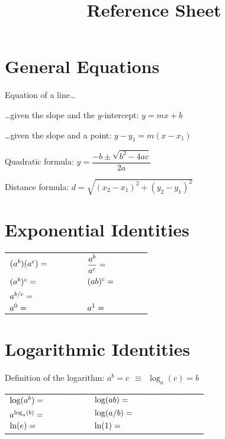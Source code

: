 \documentclass{siproblemset}
\title{Reference Sheet}
\newcommand{\anscolor}{\color{white}\hspace{0.5cm}}
\begin{document}
    \maketitle
    
    \section{General Equations}
    
    Equation of a line\dots
    
    \dots given the slope and the $y$-intercept: {\Large\anscolor  $y=mx+b$}
    
    \dots given the slope and a point: {\Large\anscolor  $y-y_1=m(x-x_1)$}
    
    \vspace{0.5cm}
    
    Quadratic formula: {\Large\anscolor  $y=\dfrac{-b\pm\sqrt{b^2-4ac}}{2a}$}
    
    \vspace{0.5cm}
    
    Distance formula: {\Large\anscolor  $d=\sqrt{(x_2-x_1)^2+(y_2-y_1)^2}$}
    
    \section{Exponential Identities}
    {\Large \begin{tabularx}{\textwidth}{XX}
    	$(a^b)(a^c)=\anscolor a^{b+c}$   & $\dfrac{a^b}{a^c}=\anscolor a^{b-c}$ \\
    	$(a^b)^c=\anscolor a^{bc}$        & $(ab)^c=\anscolor a^cb^c$            \\
    	$a^{b/c}=\anscolor \sqrt[c]{a^b}$  &                                       \\
    	$a^0=\anscolor 1$                  & $a^1=\anscolor a$
    \end{tabularx}}

    \section{Logarithmic Identities}
    Definition of the logarithm: {\Large\anscolor  $a^b=c ~~ \equiv ~~ \log_a(c)=b$}
    
    {\Large \begin{tabularx}{\textwidth}{XX}
    	$\log(a^b)=\anscolor b\log(a)$ & $\log(ab)=\anscolor \log(a)+\log(b)$  \\
    	$a^{\log_a(b)}=\anscolor b$    & $\log(a/b)=\anscolor \log(a)-\log(b)$ \\
    	$\ln(e)=\anscolor 1$           & $\ln(1)=\anscolor 0$
    \end{tabularx}}
    \newpage
    
\end{document}
